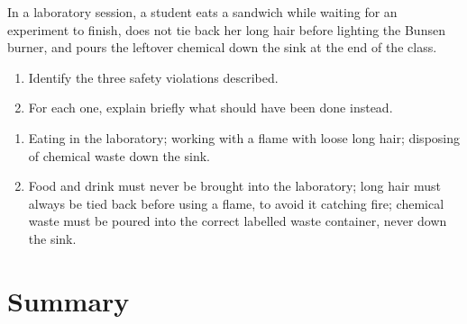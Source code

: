 \begin{exercise}
    In a laboratory session, a student eats a sandwich while waiting for an experiment to finish, does not tie back her long hair before lighting the Bunsen burner, and pours the leftover chemical down the sink at the end of the class.
    \begin{enumerate}[label=\letraminuscula]
        \item Identify the three safety violations described.
        \item For each one, explain briefly what should have been done instead.
    \end{enumerate}
    \begin{solu}
        \begin{enumerate}[label=\alph*)]
            \item Eating in the laboratory; working with a flame with loose long hair; disposing of chemical waste down the sink.
            \item Food and drink must never be brought into the laboratory; long hair must always be tied back before using a flame, to avoid it catching fire; chemical waste must be poured into the correct labelled waste container, never down the sink.
        \end{enumerate}
    \end{solu}
\end{exercise}


\section*{Summary}

